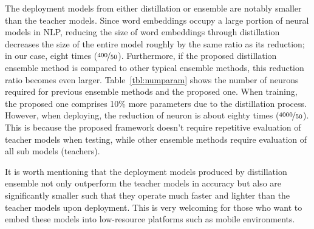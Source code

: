 \documentclass{article}
\begin{document}
The deployment models from either distillation or ensemble are notably smaller than the teacher models.
Since word embeddings occupy a large portion of neural models in NLP, reducing the size of word embeddings through distillation decreases the size of the entire model roughly by the same ratio as its reduction; in our case, eight times ($\nicefrac{400}{50}$).
Furthermore, if the proposed distillation ensemble method is compared to other typical ensemble methods, 
this reduction ratio becomes even larger.
Table~\ref{tbl:numparam} shows the number of neurons required for previous ensemble methods and the proposed one.
When training, the proposed one comprises 10\% more parameters due to the distillation process.
However, when deploying, the reduction of neuron is about eighty times ($\nicefrac{4000}{50}$).
This is because the proposed framework doesn't require repetitive evaluation of teacher models when testing, while other ensemble methods require evaluation of all sub models (teachers).





\begin{table}[htp!]
 	\centering
	\caption{The number of neurons in previous ensemble methods and the proposed distillation ensemble method for training and deploying. $M$ represents the basic unit of model size for the embedding dimension 1. This table assumes ensemble with 10  teachers.}
	\label{tbl:numparam}
	\vspace{-2ex}
\end{table}



\noindent It is worth mentioning that the deployment models produced by distillation ensemble not only outperform the teacher models in accuracy but also are significantly smaller such that they operate much faster and lighter than the teacher models upon deployment.
This is very welcoming for those who want to embed these models into low-resource platforms such as mobile environments.
\end{document}
